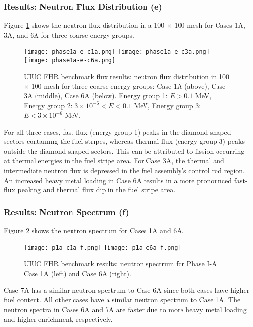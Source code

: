 \subsubsection{Results: Neutron Flux Distribution (e)}
Figure \ref{fig:phase1a-e} shows the neutron flux distribution in a 100 $\times$ 
100 mesh for Cases 1A, 3A, and 6A for three coarse energy groups. 
\begin{figure}[htbp]
    \centering
    \texttt{[image: phase1a-e-c1a.png]} 
    \texttt{[image: phase1a-e-c3a.png]} 
    \texttt{[image: phase1a-e-c6a.png]} 
    \caption{\gls{UIUC} \gls{FHR} benchmark flux results: neutron flux 
    distribution in 100 $\times$ 100 mesh for three coarse energy groups: Case 
    1A (above), Case 3A (middle), Case 6A (below). Energy group 1: $E > 0.1$ MeV, 
    Energy group 2: $3 \times 10^{-6} < E < 0.1$ MeV, Energy group 3: $E < 3 \times 10^{-6}$ MeV. }
    \label{fig:phase1a-e}
\end{figure}
For all three cases, fast-flux (energy group 1) peaks in the diamond-shaped sectors containing 
the fuel stripes, whereas thermal flux (energy group 3) peaks outside the diamond-shaped 
sectors. 
This can be attributed to fission occurring at thermal energies in the fuel stripe area. 
For Case 3A, the thermal and intermediate neutron flux is depressed in the fuel 
assembly's control rod region.  
An increased heavy metal loading in Case 6A results in a more pronounced 
fast-flux peaking and thermal flux dip in the fuel stripe area. 

\subsubsection{Results: Neutron Spectrum (f)}
Figure \ref{fig:phase1a-f} shows the neutron spectrum for Cases 1A and 6A. 
\begin{figure}[htbp]
    \centering
    \texttt{[image: p1a\_c1a\_f.png]} 
    \texttt{[image: p1a\_c6a\_f.png]} 
    \caption{\gls{UIUC} \gls{FHR} benchmark results: neutron spectrum for 
    Phase I-A Case 1A (left) and Case 6A (right).}
    \label{fig:phase1a-f}
\end{figure}
Case 7A has a similar neutron spectrum to Case 6A since both cases have 
higher fuel content. 
All other cases have a similar neutron spectrum to Case 1A.
The neutron spectra in Cases 6A and 7A are faster due to more heavy metal 
loading and higher enrichment, respectively.  

